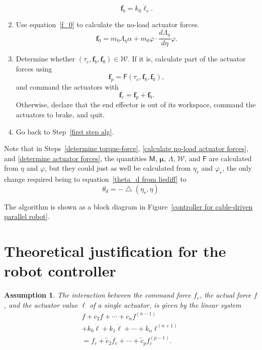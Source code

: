 \documentclass[oneside,twocolumn,reqno]{amsart}
\newcommand{\liediff}{\mathbin{\triangle}}
\newtheorem{assumption}{Assumption}
\begin{document}
\begin{enumerate}
\begin{equation}
\label{f_b}
\bm f_b = k_0 \dot{\bm\ell}_r .
\end{equation}
\item \label{calculate no-load actuator forces} Use equation~\eqref{f_0} to calculate the no-load actuator forces.
\begin{equation}
\bm f_0 = m_0 \mathsf\Lambda_\eta \alpha + m_0 \varphi \cdot \frac{d\Lambda_\eta}{d\eta} \varphi .
\end{equation}
\item \label{determine actuator forces} Determine whether $(\tau_c,\bm f_b,\bm f_0) \in \mathcal W$.  If it is, calculate part of the actuator forces using
\begin{equation}
\label{f_p}
\bm f_p = \mathsf F(\tau_c, \bm f_b,\bm f_0) ,
\end{equation}
and command the actuators with
\begin{equation}
\label{f_c}
\bm f_c = \bm f_p + \bm f_b .
\end{equation}
Otherwise, declare that the end effector is out of its workspace, command the actuators to brake, and quit.
\item Go back to Step~\ref{first step alg}.
\end{enumerate}
Note that in Steps~\ref{determine torque-force}, \ref{calculate no-load actuator forces}, and \ref{determine actuator forces}, the quantities $\mathsf M$, $\boldsymbol\mu$, $\mathsf\Lambda$, $\mathcal W$, and $\mathsf F$ are calculated from $\eta$ and $\varphi$, but they could just as well be calculated from $\eta_r$ and $\varphi_r$, the only change required being to equation~\eqref{theta_d from liediff} to
\begin{equation}
\theta_d = - \liediff(\eta_r, \eta)
\end{equation}

The algorithm is shown as a block diagram in Figure~\ref{controller for cable-driven parallel robot}.

\section{Theoretical justification for the robot controller}
\label{sec theoretical}

\begin{assumption}
\label{assume linear}
The interaction between the command force $f_c$, the actual force $f$, and the actuator value $\ell$ of a single actuator, is given by the linear system
\begin{multline}
\label{system}
f + c_2 \dot f + \cdots + c_n f^{(n-1)} \\
+ k_0 \dot \ell + k_1 \ddot \ell + \cdots + k_n \ell^{(n+1)} \\
= f_c + \tilde c_2 \dot f_c + \cdots + \tilde c_p f_c^{(p-1)}.
\end{multline}
\end{assumption}
\end{document}
